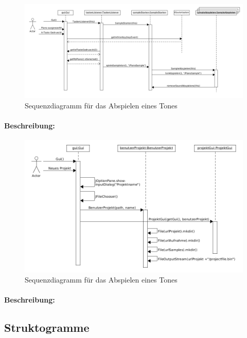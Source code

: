 \begin{figure}[h]
 \centering
 \includegraphics[width=1\textwidth]{./Bilder/Klaviertaste_Gedrueckt.png}
 \caption{Sequenzdiagramm für das Abspielen eines Tones}
\end{figure}

\paragraph{Beschreibung:} 


\newpage

\begin{figure}[h]
 \centering
 \includegraphics[width=1\textwidth]{./Bilder/Neues_Projekt.png}
 \caption{Sequenzdiagramm für das Abspielen eines Tones}
\end{figure}

\paragraph{Beschreibung:} 


\newpage

\subsection{Struktogramme}


